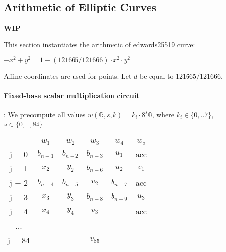 \subsection{Arithmetic of Elliptic Curves} \label{ellcurve}
\textbf{WIP}

This section instantiates the arithmetic of edwards25519 curve:
\begin{center}
$- x^2 + y^2 = 1 - (121665/121666) \cdot x^2 \cdot y^2$
\end{center}
Affine coordinates are used for points. 
Let $d$ be equal to $121665/121666$.

\paragraph{Fixed-base scalar multiplication circuit}:
We precompute all values $w(\mathbb{G},s,k) = k_i \cdot 8^s \mathbb{G}$, where $k_i \in \{ 0,..7 \}$, $s \in \{0,.., 84\}$.
\begin{center}
\begin{tabular}{ c|c|c|c|c|c } 
  & $w_1$ & $w_2$ & $w_3$ & $w_4$ & $w_o$\\ 
 \hline
j + 0 & $b_{n - 1}$ & $b_{n - 2}$ & $b_{n - 3}$ & $u_1$ & acc\\ 
j + 1 & $x_2$ & $y_2$ & $b_{n - 6}$ & $u_2$ & $v_1$\\ 
j + 2 & $b_{n - 4}$ & $b_{n - 5}$ & $v_2$ & $b_{n - 7}$ & acc\\ 
j + 3 & $x_3$ & $ y_3$ & $b_{n - 8}$ & $b_{n - 9}$ & $u_3$\\ 
j + 4 & $x_4$ & $y_4$ & $v_3$ & $-$ & acc\\ 
... & & & & &\\ 
j + 84 & $-$ & $-$ & $v_{85}$ & $-$ & $-$ \\ 
\end{tabular}
\end{center}

